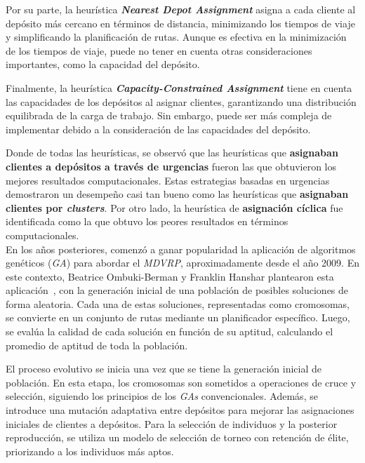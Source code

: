 \documentclass[letter, 10pt]{article}
\begin{document}
Por su parte, la heurística \textbf{\textit{Nearest Depot Assignment}} asigna a cada cliente al depósito más cercano en términos de distancia, minimizando los tiempos de viaje y simplificando la planificación de rutas. Aunque es efectiva en la minimización de los tiempos de viaje, puede no tener en cuenta otras consideraciones importantes, como la capacidad del depósito.

Finalmente, la heurística \textbf{\textit{Capacity-Constrained Assignment}} tiene en cuenta las capacidades de los depósitos al asignar clientes, garantizando una distribución equilibrada de la carga de trabajo. Sin embargo, puede ser más compleja de implementar debido a la consideración de las capacidades del depósito.

Donde de todas las heurísticas, se observó que las heurísticas que \textbf{asignaban clientes a depósitos a través de urgencias} fueron las que obtuvieron los mejores resultados computacionales. Estas estrategias basadas en urgencias demostraron un desempeño casi tan bueno como las heurísticas que \textbf{asignaban clientes por \textit{clusters}}. Por otro lado, la heurística de \textbf{asignación cíclica} fue identificada como la que obtuvo los peores resultados en términos computacionales.
\\

En los años posteriores, comenzó a ganar popularidad la aplicación de algoritmos genéticos (\textit{GA}) para abordar el \textit{MDVRP}, aproximadamente desde el año 2009. En este contexto, Beatrice Ombuki-Berman y Franklin Hanshar plantearon esta aplicación~\cite{GeneticAlgorithms2009}, con la generación inicial de una población de posibles soluciones de forma aleatoria. Cada una de estas soluciones, representadas como cromosomas, se convierte en un conjunto de rutas mediante un planificador específico. Luego, se evalúa la calidad de cada solución en función de su aptitud, calculando el promedio de aptitud de toda la población.

El proceso evolutivo se inicia una vez que se tiene la generación inicial de población. En esta etapa, los cromosomas son sometidos a operaciones de cruce y selección, siguiendo los principios de los \textit{GAs} convencionales. Además, se introduce una mutación adaptativa entre depósitos para mejorar las asignaciones iniciales de clientes a depósitos. Para la selección de individuos y la posterior reproducción, se utiliza un modelo de selección de torneo con retención de élite, priorizando a los individuos más aptos.
\end{document}
